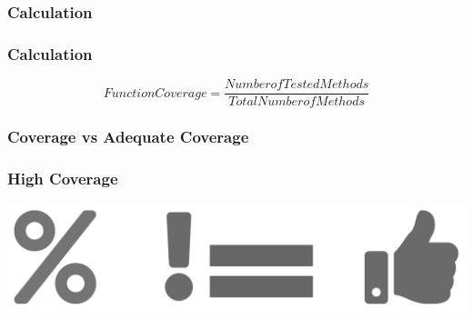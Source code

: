 \subsubsection{Calculation}
%
%
\begin{frame}
	\frametitle{Calculation}
	\begin{center}
		\begin{equation*}
			Function Coverage = \frac{Number of Tested Methods}{Total Number of Methods}
		\end{equation*}
	\end{center}
\end{frame}

\subsubsection{Coverage vs Adequate Coverage}
%
%
\begin{frame}
	\frametitle{High Coverage}
		\begin{center}
			\includegraphics[scale = .15]{images/percentEquals}
		\end{center}
\end{frame}
